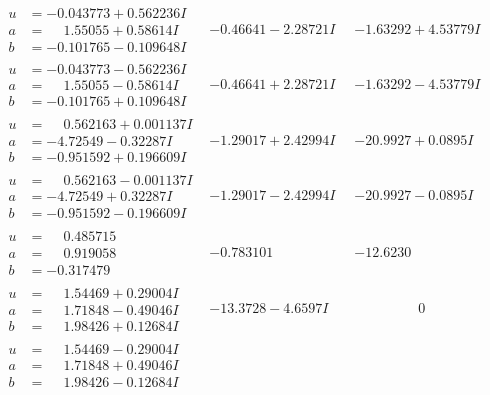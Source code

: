 \documentclass[1p]{elsarticle_modified}
\theoremstyle{definition}
\begin{document}
$$\begin{array}{c|c|c}
\begin{aligned}
u &= -0.043773 + 0.562236 I \\
a &= \phantom{-}1.55055 + 0.58614 I \\
b &= -0.101765 - 0.109648 I\end{aligned}
 & -0.46641 - 2.28721 I & -1.63292 + 4.53779 I \\ \hline\begin{aligned}
u &= -0.043773 - 0.562236 I \\
a &= \phantom{-}1.55055 - 0.58614 I \\
b &= -0.101765 + 0.109648 I\end{aligned}
 & -0.46641 + 2.28721 I & -1.63292 - 4.53779 I \\ \hline\begin{aligned}
u &= \phantom{-}0.562163 + 0.001137 I \\
a &= -4.72549 - 0.32287 I \\
b &= -0.951592 + 0.196609 I\end{aligned}
 & -1.29017 + 2.42994 I & -20.9927 + 0.0895 I \\ \hline\begin{aligned}
u &= \phantom{-}0.562163 - 0.001137 I \\
a &= -4.72549 + 0.32287 I \\
b &= -0.951592 - 0.196609 I\end{aligned}
 & -1.29017 - 2.42994 I & -20.9927 - 0.0895 I \\ \hline\begin{aligned}
u &= \phantom{-}0.485715\phantom{ +0.000000I} \\
a &= \phantom{-}0.919058\phantom{ +0.000000I} \\
b &= -0.317479\phantom{ +0.000000I}\end{aligned}
 & -0.783101\phantom{ +0.000000I} & -12.6230\phantom{ +0.000000I} \\ \hline\begin{aligned}
u &= \phantom{-}1.54469 + 0.29004 I \\
a &= \phantom{-}1.71848 - 0.49046 I \\
b &= \phantom{-}1.98426 + 0.12684 I\end{aligned}
 & -13.3728 - 4.6597 I & \phantom{-0.000000 } 0 \\ \hline\begin{aligned}
u &= \phantom{-}1.54469 - 0.29004 I \\
a &= \phantom{-}1.71848 + 0.49046 I \\
b &= \phantom{-}1.98426 - 0.12684 I\end{aligned}

\end{array}$$
\end{document}
